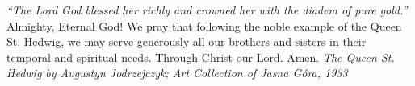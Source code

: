 \pagestyle{empty}
\hspace{0pt}
\vfill

\textit{``The Lord God blessed her richly and crowned her with
the diadem of pure gold.''}
\medbreak
Almighty, Eternal God! We pray that following the noble
example of the Queen St. Hedwig, we may serve generously all our
brothers and sisters in their temporal and spiritual needs. Through
Christ our Lord. Amen.
\vfill
\textit{The Queen St. Hedwig by Augustyn Jodrzejczyk; Art Collection of
Jasna Góra, 1933}
\hspace{0pt}
\newpage
